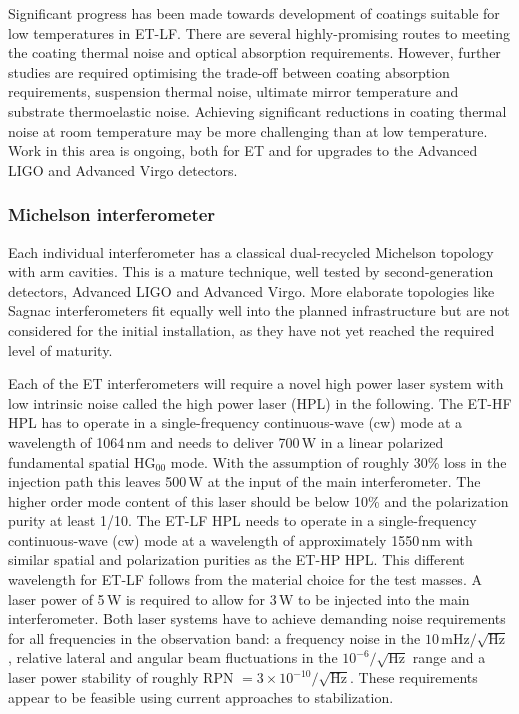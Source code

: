 Significant progress has been made towards development of coatings suitable for low temperatures in ET-LF. There are several highly-promising routes to meeting the coating thermal noise and optical absorption requirements. 
However, further studies are required optimising the trade-off between coating absorption requirements, suspension thermal noise, ultimate mirror temperature and substrate thermoelastic noise.
Achieving significant reductions in coating thermal noise at room temperature
may be more challenging than at low temperature. Work in this area is ongoing,
both for ET and for upgrades to the Advanced LIGO and Advanced Virgo detectors.

\subsubsection{Michelson interferometer}

Each individual interferometer has a classical dual-recycled Michelson topology with arm cavities. This is a mature technique, well tested by  
second-generation detectors, Advanced LIGO and Advanced Virgo. More elaborate topologies like Sagnac interferometers fit equally well into the planned infrastructure but are not considered for the initial installation, as they have not yet reached the required level of maturity.

Each of the ET interferometers will require a novel high power laser system with
low intrinsic noise called the high power laser (HPL) in the following. 
The ET-HF HPL has to operate in a single-frequency continuous-wave (cw) mode at a wavelength of 1064\,nm and needs to deliver 700\,W in a linear polarized fundamental spatial HG$_{00}$ mode. With the assumption of roughly 30\% loss in the injection path this leaves 500\,W at the input of the main interferometer. The higher order mode content of this laser should be below 10\% and the polarization purity at least 1/10. 
The ET-LF HPL needs to operate in a single-frequency continuous-wave (cw) mode at a wavelength of approximately 1550\,nm with similar spatial and polarization purities as the ET-HP HPL. This different wavelength for ET-LF follows from the material choice for the test masses.
A laser power of 5\,W is required to allow for 3\,W to be injected into the main interferometer. Both laser systems have to achieve demanding noise requirements for all frequencies in the observation band:
a frequency noise in the $10\,\mathrm{mHz} / \sqrt{\mathrm{Hz}}$, relative lateral
and angular beam fluctuations in the $10^{-6} / \sqrt{\mathrm{Hz}}$ range
and a laser power stability of roughly RPN $= 3\!\times\!10^{-10} /
\sqrt{\mathrm{Hz}}$. These requirements appear to be feasible using current approaches to stabilization.

